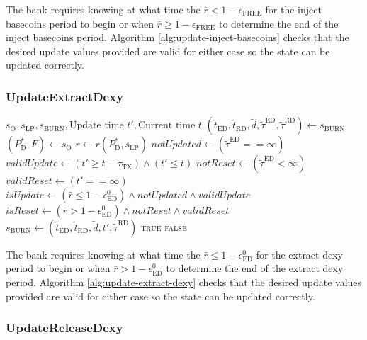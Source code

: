 \documentclass{ifcolog}
\newcommand{\Pdt}{P_{\mathrm{D}}^{*}}
\newcommand{\rr}{\bar{r}}
\newcommand{\slp}{s_{\mathrm{LP}}}
\newcommand{\soracle}{s_{\textrm{O}}}
\newcommand{\sburn}{s_{\textrm{BURN}}}
\newcommand{\tautx}{\tau_{\textrm{TX}}}
\newcommand{\epsilonfree}{\epsilon_{\textrm{FREE}}}
\newcommand{\epsilondexyzero}{\epsilon_{\textrm{ED}}^{0}}
\begin{document}
The bank requires knowing at what time the $\rr < 1 - \epsilonfree$ for the inject basecoins period to begin 
or when $\rr \ge 1 - \epsilonfree$ to determine the end of the inject basecoins period. 
Algorithm \ref{alg:update-inject-basecoins} checks that the desired update values provided are valid for either case so the state 
can be updated correctly.

\newpage

\subsubsection{UpdateExtractDexy}

\begin{algorithm}[H]
\caption{UpdateExtractDexy}\label{alg:update-extract-dexy}
\begin{algorithmic}[1]
\Require $\soracle, \slp, \sburn, \textrm{Update time } t', \textrm{Current time } t$
\State $(\tilde{t}_{\textrm{ED}}, \tilde{t}_{\textrm{RD}}, \tilde{d}, \tilde{\tau}^{\textrm{ED}}, \tilde{\tau}^{\textrm{RD}}) \gets \sburn$
\State $(\Pdt, F) \gets \soracle$ 
\State $\rr \gets \rr(\Pdt, \slp)$
\State $notUpdated \gets (\tilde{\tau}^{\textrm{ED}} == \infty)$
\State $validUpdate \gets (t' \ge t - \tautx) \land (t' \le t)$ 
\State $notReset \gets (\tilde{\tau}^{\textrm{ED}} < \infty)$
\State $validReset \gets (t' == \infty)$
\State $isUpdate \gets (\rr \le 1 - \epsilondexyzero) \land notUpdated \land validUpdate$ 
\State $isReset \gets (\rr > 1 - \epsilondexyzero) \land notReset \land validReset$
  \State $\sburn \gets (\tilde{t}_{\textrm{ED}}, \tilde{t}_{\textrm{RD}}, \tilde{d}, t', \tilde{\tau}^{\textrm{RD}})$
  \State \Return \textsc{true}
\Else
  \State \Return \textsc{false}
\EndIf
\end{algorithmic}
\end{algorithm}

The bank requires knowing at what time the $\rr \le 1 - \epsilondexyzero$ for the extract dexy period to begin 
or when $\rr > 1 - \epsilondexyzero$ to determine the end of the extract dexy period. 
Algorithm \ref{alg:update-extract-dexy} checks that the desired update values provided are valid for either case so the state 
can be updated correctly.

\newpage

\subsubsection{UpdateReleaseDexy}
\end{document}
